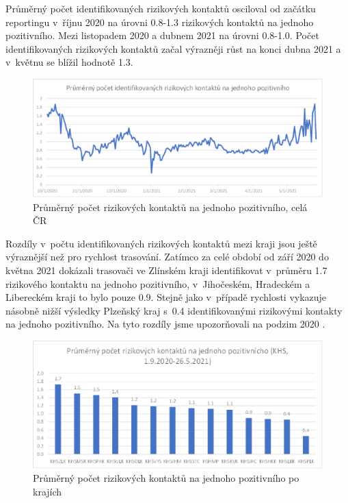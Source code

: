 Průměrný počet identifikovaných rizikových kontaktů osciloval od začátku reportingu v~říjnu 2020 na úrovni 0.8-1.3 rizikových kontaktů na jednoho pozitivního. Mezi listopadem 2020 a dubnem 2021 na úrovni 0.8-1.0. Počet identifikovaných rizikových kontaktů začal výrazněji růst na konci dubna 2021 a v~květnu se blížil hodnotě 1.3.

\begin{figure}[ht]
    \centering
    \includegraphics[width=1\textwidth]{./pic/e.eps}
    \caption{Průměrný počet rizikových kontaktů na jednoho pozitivního, celá ČR}
    \label{fig:rizik1}
\end{figure}

Rozdíly v~počtu identifikovaných rizikových kontaktů mezi kraji jsou ještě vý\-raz\-něj\-ší než pro rychlost trasování. Zatímco za celé období od září 2020 do května 2021 dokázali trasovači ve Zlínském kraji identifikovat v~průměru 1.7 rizikového kontaktu na jednoho pozitivního, v~Jihočeském, Hradeckém a Libereckém kraji to bylo pouze 0.9. Stejně jako v~případě rychlosti vykazuje násobně nižší výsledky Plzeňský kraj s~0.4 identifikovanými rizikovými kontakty na jednoho pozitivního. Na tyto rozdíly jsme upozorňovali na podzim 2020 \cite{tr_bisop04}.

\begin{figure}[ht]
    \centering
    \includegraphics[width=1\textwidth]{./pic/f.eps}
    \caption{Průměrný počet rizikových kontaktů na jednoho pozitivního po krajích}
    \label{fig:rizik1kraj}
\end{figure}


